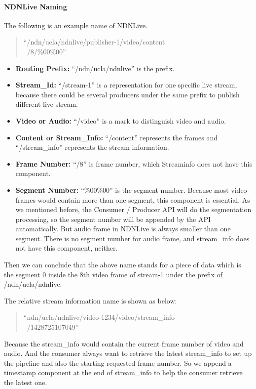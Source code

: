 \paragraph{NDNLive Naming} %
\label{par:ndnlive_naming}

The following is an example name of NDNLive. 

\begin{quote}
``/ndn/ucla/ndnlive/publisher-1/video/content \\\ /8/\%00\%00''
\end{quote}
\begin{itemize}
	\item{\textbf{Routing Prefix:}} ``/ndn/ucla/ndnlive'' is the prefix.
	\item{\textbf{Stream\_Id:}} ``/stream-1'' is a representation for one specific live stream, because there could be several producers under the same prefix to publish different live stream.
	\item{\textbf{Video or Audio:}} ``/video'' is a mark to distinguish video and audio.
	\item{\textbf{Content or Stream\_Info:}} ``/content'' represents the frames and ``/stream\_info'' represents the stream information.
	\item{\textbf{Frame Number:}} ``/8'' is frame number, which Streaminfo does not have this component.
	\item{\textbf{Segment Number:}} ``\%00\%00'' is the segment number. Because most video frames would contain more than one segment, this component is essential. As we mentioned before, the Consumer / Producer API will do the segmentation processing, so the segment number will be appended by the API automatically. But audio frame in NDNLive is always smaller than one segment. There is no segment number for audio frame, and stream\_info does not have this component, neither.
\end{itemize}

Then we can conclude that the above name stands for a piece of data which is the segment 0 inside the 8th video frame of stream-1 under the prefix of /ndn/ucla/ndnlive. 

The relative stream information name is shown as below:
\begin{quote}
``ndn/ucla/ndnlive/video-1234/video/stream\_info \\\ /1428725107049''
\end{quote}

Because the stream\_info would contain the current frame number of video and audio. And the consumer always want to retrieve the latest stream\_info to set up the pipeline and also the starting requested frame number. So we append a timestamp component at the end of stream\_info to help the consumer retrieve the latest one.

